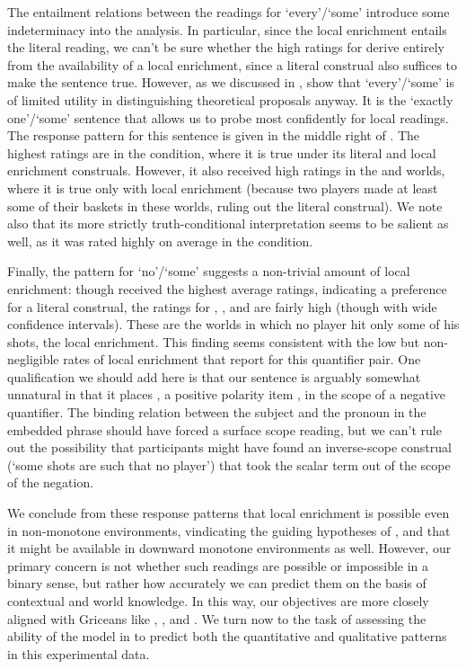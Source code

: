 \documentclass[leqno]{article}
\begin{document}
The entailment relations between the readings for `every'/`some'
introduce some indeterminacy into the analysis. In particular, since
the local enrichment entails the literal reading, we can't be sure
whether the high ratings for  derive entirely from the
availability of a local enrichment, since a literal construal also
suffices to make the sentence true. However, as we discussed in
, \citeauthor{Chemla:Spector:2011} show that
`every'/`some' is of limited utility in distinguishing theoretical
proposals anyway. It is the `exactly one'/`some' sentence that allows
us to probe most confidently for local readings. The response pattern
for this sentence is given in the middle right of
. The highest ratings are in the 
condition, where it is true under its literal and local enrichment
construals. However, it also received high ratings in the 
and  worlds, where it is true only with local enrichment
(because two players made at least some of their baskets in these
worlds, ruling out the literal construal).  We note also that its more
strictly truth-conditional interpretation seems to be salient as well,
as it was rated highly on average in the  condition.

Finally, the pattern for `no'/`some' suggests a non-trivial amount of
local enrichment: though  received the highest average
ratings, indicating a preference for a literal construal, the ratings
for , , and  are fairly high (though
with wide confidence intervals). These are the worlds in which no
player hit only some of his shots, the local enrichment. This finding
seems consistent with the low but non-negligible rates of local
enrichment that  report for this
quantifier pair. One qualification we should add here is that our
sentence is arguably somewhat unnatural in that it places ,
a positive polarity item \citep{Baker70,Israel96}, in the scope of a
negative quantifier. The binding relation between the subject and the
pronoun  in the embedded phrase should have forced a surface
scope reading, but we can't rule out the possibility that participants
might have found an inverse-scope construal (`some shots are such that
no player') that took the scalar term out of the scope of the
negation.

We conclude from these response patterns that local enrichment is
possible even in non-monotone environments, vindicating the guiding
hypotheses of \citet{Chemla:Spector:2011}, and that it might be
available in downward monotone environments as well. However, our
primary concern is not whether such readings are possible or
impossible in a binary sense, but rather how accurately we can predict
them on the basis of contextual and world knowledge. In this way, our
objectives are more closely aligned with Griceans like
\citet{Geurts09}, \citet{Geurts:Pouscoulous:2009}, and
\citet{geurts-vantiel:2013:scalar}. We turn now to the task of
assessing the ability of the model in  to predict
both the quantitative and qualitative patterns in this experimental
data.
\end{document}
